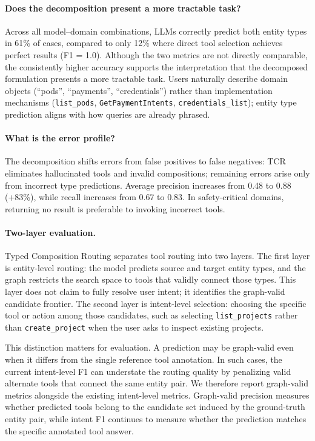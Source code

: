 \paragraph{Does the decomposition present a more tractable task?}

Across all model--domain combinations, LLMs correctly predict both entity types in 61\% of cases, compared to only 12\% where direct tool selection achieves perfect results (F1 = 1.0).
Although the two metrics are not directly comparable, the consistently higher accuracy supports the interpretation that the decomposed formulation presents a more tractable task.
Users naturally describe domain objects (``pods'', ``payments'', ``credentials'') rather than implementation mechanisms (\texttt{list\_pods}, \texttt{GetPaymentIntents}, \texttt{credentials\_list}); entity type prediction aligns with how queries are already phrased.

\paragraph{What is the error profile?}

The decomposition shifts errors from false positives to false negatives: TCR eliminates hallucinated tools and invalid compositions; remaining errors arise only from incorrect type predictions.
Average precision increases from 0.48 to 0.88 (+83\%), while recall increases from 0.67 to 0.83.
In safety-critical domains, returning no result is preferable to invoking incorrect tools.

\paragraph{Two-layer evaluation.}

Typed Composition Routing separates tool routing into two layers.
The first layer is entity-level routing: the model predicts source and target entity types, and the graph restricts the search space to tools that validly connect those types.
This layer does not claim to fully resolve user intent; it identifies the graph-valid candidate frontier.
The second layer is intent-level selection: choosing the specific tool or action among those candidates, such as selecting \texttt{list\_projects} rather than \texttt{create\_project} when the user asks to inspect existing projects.

This distinction matters for evaluation.
A prediction may be graph-valid even when it differs from the single reference tool annotation.
In such cases, the current intent-level F1 can understate the routing quality by penalizing valid alternate tools that connect the same entity pair.
We therefore report graph-valid metrics alongside the existing intent-level metrics.
Graph-valid precision measures whether predicted tools belong to the candidate set induced by the ground-truth entity pair, while intent F1 continues to measure whether the prediction matches the specific annotated tool answer.

